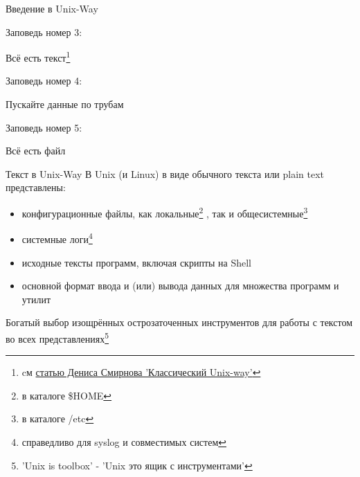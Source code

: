 




\firstframe

\begin{frame}{Введение в Unix-Way}
  
  Заповедь номер 3:\newline 
  \begin{center}
    \alert{\Huge{Всё есть текст}}\footnote{cм \href{http://www.freesource.info/wiki/Stat'ja\_Klassicheskijj\_Unix\_Way}{статью Дениса Смирнова 'Классический Unix-way'} }\newline
  \end{center} \pause
  
  Заповедь номер 4:\newline
  \begin{center}
    \alert{\Huge{Пускайте данные по трубам}}\newline
  \end{center} \pause

  Заповедь номер 5:\newline
  \begin{center}
    \alert{\Huge{Всё есть файл}}\newline
  \end{center}

\end{frame}

\begin{frame}{Текст в Unix-Way}
  В Unix (и Linux) в виде обычного текста или \alert{plain text} представлены:\pause
  \begin{itemize}
    \item \alert{конфигурационные файлы}, как локальные\footnote{в каталоге \$HOME} , так и общесистемные\footnote{в каталоге /etc} \pause
    \item \alert{системные логи}\footnote{справедливо для \alert{syslog} и совместимых систем}
    \item \alert{исходные тексты программ}, включая скрипты на Shell
    \item \alert{основной формат ввода и (или) вывода данных} для множества программ и утилит
  \end{itemize} \pause

  Богатый выбор изощрённых острозаточенных инструментов для работы с текстом во всех представлениях\footnote{'Unix is toolbox' - 'Unix это ящик с инструментами'}

\end{frame}

